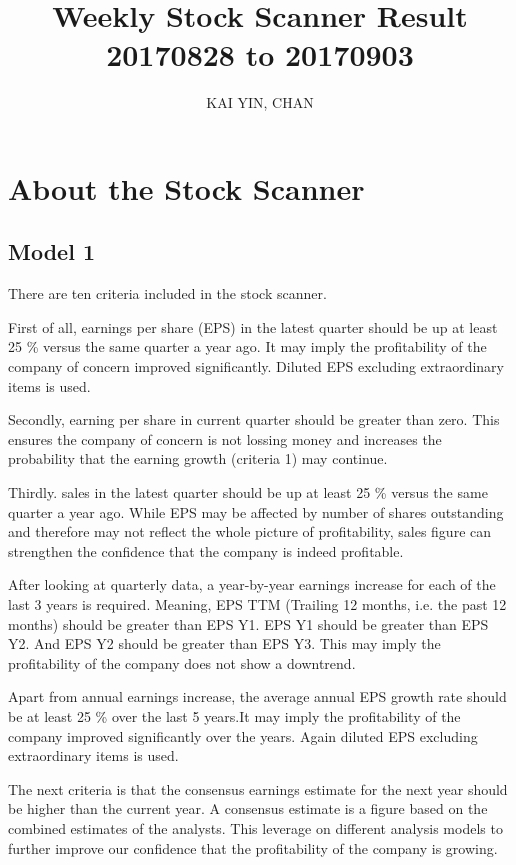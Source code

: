 \documentclass{article}
\begin{document}
\title{Weekly Stock Scanner Result \\ 20170828 to 20170903}
\author{KAI YIN, CHAN}
\maketitle

\section{About the Stock Scanner}
\subsection{Model 1}
There are ten criteria included in the stock scanner. 

First of all, earnings per share (EPS) in the latest quarter should be up at least 25 \% versus the same quarter a year ago. It may imply the profitability of the company of concern improved significantly. Diluted EPS excluding extraordinary items is used.

Secondly, earning per share in current quarter should be greater than zero. This ensures the company of concern is not lossing money and increases the probability that the earning growth (criteria 1) may continue.

Thirdly. sales in the latest quarter should be up at least 25 \% versus the same quarter a year ago. While EPS may be affected by number of shares outstanding and therefore may not reflect the whole picture of profitability, sales figure can strengthen the confidence that the company is indeed profitable.

After looking at quarterly data, a year-by-year earnings increase for each of the last 3 years is required. Meaning, EPS TTM (Trailing 12 months, i.e. the past 12 months) should be greater than EPS Y1. EPS Y1 should be greater than EPS Y2. And EPS Y2 should be greater than EPS Y3. This may imply the profitability of the company does not show a downtrend.

Apart from annual earnings increase, the average annual EPS growth rate should be at least 25 \% over the last 5 years.It may imply the profitability of the company improved significantly over the years. Again diluted EPS excluding extraordinary items is used.

The next criteria is that the consensus earnings estimate for the next year should be higher than the current year. A consensus estimate is a figure based on the combined estimates of the analysts. This leverage on different analysis models to further improve our confidence that the profitability of the company is growing.
\end{document}
